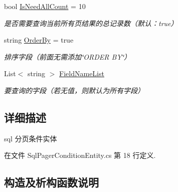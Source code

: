 \begin{DoxyCompactItemize}
bool \hyperlink{class_x_c_l_net_tools_1_1_entity_1_1_sql_pager_condition_entity_ae14dfee7db160c5c894201e014cc1ce0}{Is\+Need\+All\+Count} = 10
\begin{DoxyCompactList}\small\item\em 是否需要查询当前所有页结果的总记录数（默认：true） \end{DoxyCompactList}\item 
string \hyperlink{class_x_c_l_net_tools_1_1_entity_1_1_sql_pager_condition_entity_a311a6c9cbb127ec03d11e8211dc42e37}{Order\+By} = true
\begin{DoxyCompactList}\small\item\em 排序字段（前面无需添加\char`\"{}\+O\+R\+D\+E\+R B\+Y\char`\"{}） \end{DoxyCompactList}\item 
List$<$ string $>$ \hyperlink{class_x_c_l_net_tools_1_1_entity_1_1_sql_pager_condition_entity_a18c7b5f8ccc1dd9b47c897ad3ff29899}{Field\+Name\+List}
\begin{DoxyCompactList}\small\item\em 要查询的字段（若无值，则默认为所有字段） \end{DoxyCompactList}\end{DoxyCompactItemize}


\subsection{详细描述}
sql 分页条件实体 



在文件 Sql\+Pager\+Condition\+Entity.\+cs 第 18 行定义.



\subsection{构造及析构函数说明}
\mbox{\label{class_x_c_l_net_tools_1_1_entity_1_1_sql_pager_condition_entity_a8b6d71348a2cbfd9f609215a9d1af699}} 
